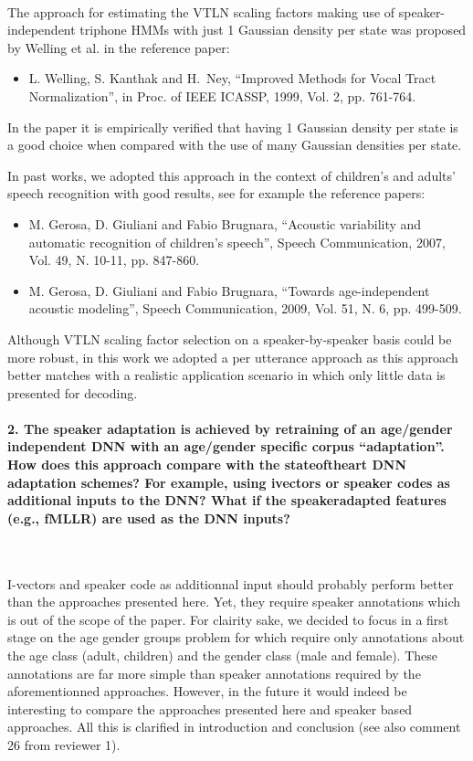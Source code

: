 \documentclass[]{article}
\begin{document}
~

The   approach  for  estimating   the  VTLN   scaling factors  making   use  of
speaker-independent  triphone  HMMs  with  just 1 Gaussian density  per  state  was
proposed by Welling et al. in the reference paper:
\begin{itemize}
\item L. Welling, S. Kanthak and  H.~Ney, ``Improved Methods for Vocal Tract                                              
Normalization'', in Proc. of IEEE ICASSP, 1999, Vol. 2, pp. 761-764.
\end{itemize}

In the paper it is empirically verified that having 1 Gaussian density
per state is a good  choice when compared
with the use of many Gaussian densities per state.

In past works, we  adopted this approach  in the context  of children's
and adults' speech recognition  with good results,  see for example  the reference
papers:

\begin{itemize}
\item M. Gerosa, D. Giuliani  and Fabio Brugnara, ``Acoustic variability and
automatic recognition of children’s speech'', Speech Communication,
2007, Vol. 49, N. 10-11, pp. 847-860.
\item M. Gerosa, D. Giuliani and Fabio Brugnara, ``Towards age-independent acoustic modeling'',
Speech Communication, 2009, Vol. 51, N. 6, pp. 499-509.
\end{itemize}

Although VTLN scaling factor selection on a speaker-by-speaker basis
could be more robust, in this work we adopted a per utterance approach
as this approach better matches with a realistic application scenario
in which only little data is presented for decoding.


\paragraph{2. The speaker adaptation is achieved by retraining of an age/gender independent DNN with an age/gender specific corpus “adaptation”. How does this approach compare with the stateoftheart DNN adaptation schemes? For example, using ivectors or speaker codes as additional inputs to the DNN? What if the speakeradapted features (e.g., fMLLR) are used as the DNN inputs?}

~

I-vectors and speaker code as additionnal input should probably perform better than the approaches presented here. Yet, they require speaker annotations which is out of the scope of the paper. For clairity sake, we decided to focus in a first stage on the age gender groups problem for which require only annotations about the age class (adult, children) and the gender class (male and female). These annotations are far more simple than speaker annotations required by the aforementionned approaches. However, in the future it would indeed be interesting to compare the approaches presented here and speaker based approaches. All this is clarified in introduction and conclusion (see also comment 26 from reviewer 1).
\end{document}
